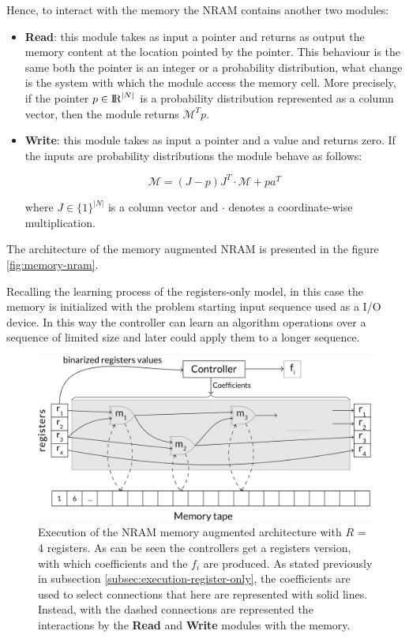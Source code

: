 Hence, to interact with the memory the NRAM contains another two modules:
\begin{itemize}
	\item{\textbf{Read}: this module takes as input a pointer and returns as output the memory content at the location pointed by the pointer. This behaviour is the same both the pointer is an integer or a probability distribution, what change is the system with which the module access the memory cell. More precisely, if the pointer $p\in\textrm{I\!R}^{|N|}$ is a probability distribution represented as a column vector, then the module returns $\mathcal{M}^{T}p$.}
	\item{\textbf{Write}: this module takes as input a pointer and a value and returns zero. If the inputs are probability distributions the module behave as follows:
\begin{center}
	\begin{equation}
	\mathcal{M} = (J - p)J^{T} \cdot \mathcal{M} + pa^{T}
	\end{equation}
\end{center}	
where $J \in \{1\}^{|N|}$ is a column vector and $\cdot$ denotes a coordinate-wise multiplication.}
\end{itemize}
The architecture of the memory augmented NRAM is presented in the figure \ref{fig:memory-nram}.

Recalling the learning process of the registers-only model, in this case the memory is initialized with the problem starting input sequence used as a I/O device. In this way the controller can learn an algorithm operations over a sequence of limited size and later could apply them to a longer sequence.

\begin{figure}[t!]
	\centering
	\includegraphics[width=\textwidth]{figures/memory-augmented-model.png}
	\caption{Execution of the NRAM memory augmented architecture with $R$ = 4 registers. As can be seen the controllers get a registers  version, with which coefficients and the $f_{i}$ are produced. As stated previously in subsection \ref{subsec:execution-register-only}, the coefficients are used to select connections that here are represented with solid lines. Instead, with the dashed connections are represented the interactions by the \textbf{Read} and \textbf{Write} modules with the memory.}
	\label{fig:perceptron-boundaries}
\end{figure}

